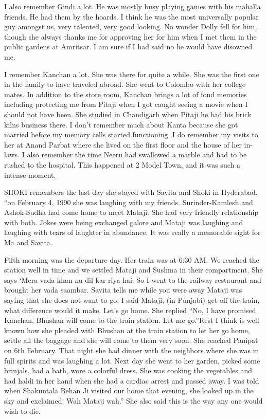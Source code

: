 I also remember Gindi a lot. He was mostly busy playing games with his mahalla friends. He had them by the hoards. I think he was the most universally popular guy amongst us, very talented, very good looking. No wonder Dolly fell for him, though she always thanks me for approving her for him when I met them in the public gardens at Amritsar. I am sure if I had said no he would have disowned me.

I remember Kanchan a lot. She was there for quite a while. She was the first one in the family to have traveled abroad. She went to Colombo with her college mates. In addition to the store room, Kanchan brings a lot of fond memories including protecting me from Pitaji when I got caught seeing a movie when I should not have been. She studied in Chandigarh when Pitaji he had his brick kilns business there. 
I don’t remember much about Kanta because she got married before my memory cells started functioning. I do remember my visits to her at Anand Parbat where she lived on the first floor and the house of her in-laws. I also remember the time Neeru had swallowed a marble and had to be rushed to the hospital. This happened at 2 Model Town, and it was such a intense moment.

SHOKI remembers the last day she stayed with Savita and Shoki in Hyderabad. 
“on February 4, 1990 she was laughing with my friends. Surinder-Kamlesh and Ashok-Sudha had come home to meet Mataji. She had very friendly relationship with both. Jokes were being exchanged galore and Mataji was laughing and laughing with tears of laughter in abundance. It was really a memorable sight for Ma and Savita. 

Fifth morning was the departure day. Her train was at 6:30 AM. We reached the station well in time and we settled Mataji and Sushma in their compartment. She says 
‘Mera vada khan nu dil kar riya hai. So I went to the railway restaurant and brought her vada saambar. Savita tells me while you were away Mataji was saying that she does not want to go. I said Mataji, (in Punjabi) get off the train, what difference would it make. Let’s go home. She replied “No, I have promised Kanchan, Bhushan will come to the train station. Let me go.”Rest I think is well known how she pleaded with Bhushan at the train station to let her go home, settle all the baggage and she will come to them very soon. She reached Panipat on 6th February. That night she had dinner with the neighbors where she was in full spirits and was laughing a lot. Next day she went to her garden, picked some brinjals, had a bath, wore a colorful dress. She was cooking the vegetables and had haldi in her hand when she had a cardiac arrest and passed away. I was told when Shakuntala Behan Ji visited our home that evening, she looked up in the sky and exclaimed: Wah Mataji wah.” She also said this is the way any one would wish to die. 

